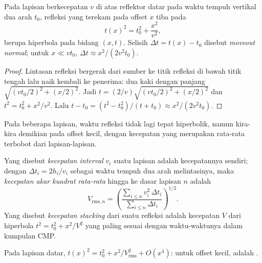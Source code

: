 \begin{theorem}\label{thm:b3:exploration-seismology:nmo}
Pada lapisan berkecepatan $v$ di atas reflektor datar pada waktu tempuh vertikal dua arah
$t_0$, refleksi yang terekam pada offset $x$ tiba pada
\[
  t(x)^2 = t_0^2 + \frac{x^2}{v^2},
\]
berupa hiperbola pada bidang $(x, t)$. Selisih $\Delta t = t(x) - t_0$ disebut
\emph{moveout normal}; untuk $x \ll vt_0$,
$\Delta t \approx x^2/(2v^2t_0)$.
\end{theorem}

\begin{proof}
Lintasan refleksi bergerak dari sumber ke titik refleksi di bawah
titik tengah lalu naik kembali ke penerima: dua kaki dengan panjang
$\sqrt{(vt_0/2)^2 + (x/2)^2}$. Jadi $t = (2/v)\sqrt{(vt_0/2)^2 + (x/2)^2}$ dan
$t^2 = t_0^2 + x^2/v^2$. Lalu $t - t_0 = (t^2 - t_0^2)/(t + t_0) \approx
x^2/(2v^2t_0)$.
\end{proof}

Pada beberapa lapisan, waktu refleksi tidak lagi tepat hiperbolik, namun
kira-kira demikian pada offset kecil, dengan kecepatan yang merupakan rata-rata terbobot dari
lapisan-lapisan.

\begin{definition}\label{def:b3:exploration-seismology:velocities}
Yang disebut \emph{kecepatan interval} $v_i$ suatu lapisan adalah
kecepatannya sendiri; dengan $\Delta t_i = 2h_i/v_i$ sebagai waktu tempuh dua arah melintasinya, maka
\emph{kecepatan akar kuadrat rata-rata} hingga ke
dasar lapisan $n$ adalah
\[
  V_{\text{rms},n} = \left(\frac{\sum_{i\le n}v_i^2\,\Delta t_i}{\sum_{i\le n}\Delta t_i}\right)^{1/2}.
\]
Yang disebut \emph{kecepatan stacking} dari suatu refleksi adalah
kecepatan $V$ dari hiperbola $t^2 = t_0^2 + x^2/V^2$ yang paling sesuai dengan waktu-waktunya dalam
kumpulan CMP.
\end{definition}

\begin{proposition}\label{prop:b3:exploration-seismology:rms}
Pada lapisan datar, $t(x)^2 = t_0^2 + x^2/V_{\text{rms}}^2 + O(x^4)$: untuk offset
kecil,  adalah .
\end{proposition}

